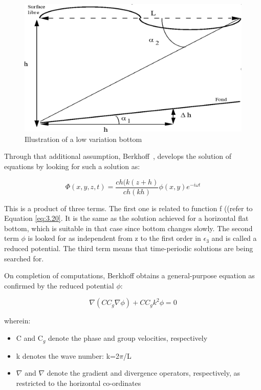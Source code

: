\begin{figure}[H]%
\begin{center}
%
  \includegraphics[width=\textwidth]{./graphics/lowvariation_bottom}
%
\caption{Illustration of a low variation bottom}\label{fig:notations}
\end{center}
\end{figure}

Through that additional assumption, Berkhoff~\cite{berkhoff1976}, develops the
solution of equations by looking for such a solution as:

\begin{equation}
  \Phi(x,y,z,t) = \frac{ch(k(z+h)}{ch(kh)}\phi(x,y)e^{-i\omega t}
  \label{eq:3.23}
\end{equation}

This is a product of three terms. The first one is related to function f
((refer to Equation \eqref{eq:3.20}. It is the same as the solution
achieved for a horizontal flat bottom, which is suitable in that case since
bottom changes slowly. The second term $\phi$ is looked for as independent from
z to the first order in $\epsilon_{3}$ and is called a reduced potential.
The third term means that time-periodic solutions are being searched for.

On completion of computations, Berkhoff obtains a general-purpose equation as
confirmed by the reduced potential $\phi$:

\begin{equation}
  \nabla(CC_{g}\nabla\phi)+CC_{g}k^{2}\phi = 0
  \label{eq:3.24}
\end{equation}

wherein:

\begin{itemize}
\item  C and C${}_{g}$ denote the phase and group velocities, respectively

\item  k denotes the wave number: k=2$\pi$/L

\item  $\nabla$ and $\nabla$ denote the gradient and divergence operators, respectively, as
  restricted to the horizontal co-ordinates
\end{itemize}

